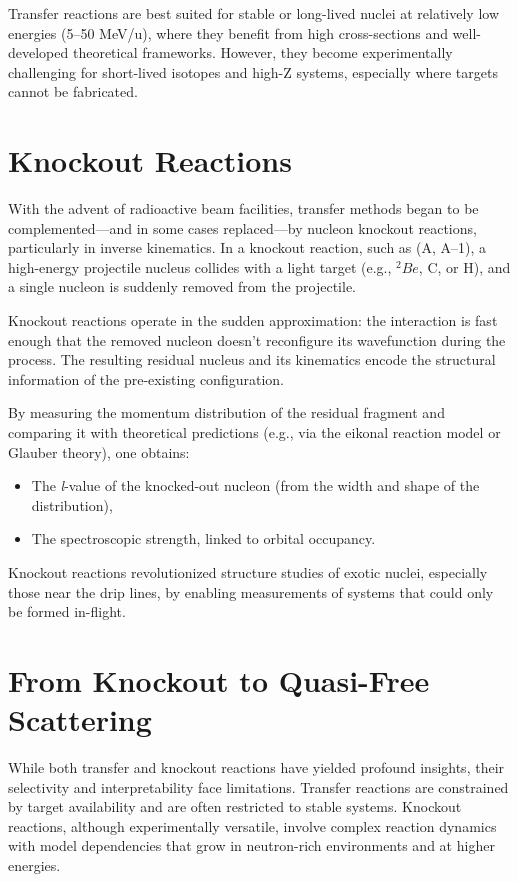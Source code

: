 Transfer reactions are best suited for stable or long-lived nuclei at relatively low energies (5–50 MeV/u), where they benefit from high cross-sections and well-developed theoretical frameworks. However, they become experimentally challenging for short-lived isotopes and high-Z systems, especially where targets cannot be fabricated.


\section{Knockout Reactions}

With the advent of radioactive beam facilities, transfer methods began to be complemented—and in some cases replaced—by nucleon knockout reactions, particularly in inverse kinematics. In a knockout reaction, such as (A, A–1), a high-energy projectile nucleus collides with a light target (e.g., $^2Be$, C, or H), and a single nucleon is suddenly removed from the projectile.

Knockout reactions operate in the sudden approximation: the interaction is fast enough that the removed nucleon doesn't reconfigure its wavefunction during the process. The resulting residual nucleus and its kinematics encode the structural information of the pre-existing configuration.

By measuring the momentum distribution of the residual fragment and comparing it with theoretical predictions (e.g., via the eikonal reaction model or Glauber theory), one obtains:

\begin{itemize}
	\item The \emph{l}-value of the knocked-out nucleon (from the width and shape of the distribution),
	\item The spectroscopic strength, linked to orbital occupancy.
\end{itemize}


Knockout reactions revolutionized structure studies of exotic nuclei, especially those near the drip lines, by enabling measurements of systems that could only be formed in-flight.

\section{From Knockout to Quasi-Free Scattering}

While both transfer and knockout reactions have yielded profound insights, their selectivity and interpretability face limitations. Transfer reactions are constrained by target availability and are often restricted to stable systems. Knockout reactions, although experimentally versatile, involve complex reaction dynamics with model dependencies that grow in neutron-rich environments and at higher energies.

